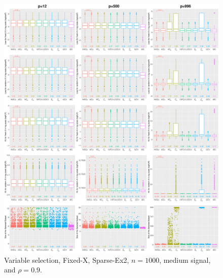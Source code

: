 \begin{figure}[!ht]
\centering
\includegraphics[width=\textwidth]{figures/supplement/fixedx/subset_selection/Sparse-Ex2_n1000_msnr_rho09.eps}
\caption{Variable selection, Fixed-X, Sparse-Ex2, $n=1000$, medium signal, and $\rho=0.9$.}
\end{figure}
\clearpage

